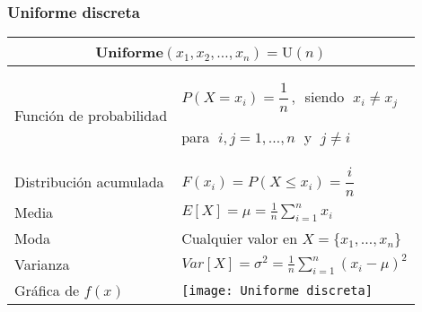 \documentclass[12pt,a4paper]{article}
\begin{document}
\subsubsection*{Uniforme discreta}
\begin{center}
	\begin{tabular}{p{}|p{}}
	\multicolumn{2}{c}{Uniforme$(x_1,x_2,\ldots,x_n) = \text{U}(n)$} \\
	\hline
	Función de probabilidad & $P(X = x_i) = \dfrac{1}{n}\, ,\,$ siendo $\; x_i\neq x_j$\par para $\; i,j = 1,\ldots,n\;$ y $\; j\neq i$ \\
	Distribución acumulada & $F(x_i) = P(X\leq x_i) = \dfrac{i}{n}$ \\
	Media & $E[X] = \mu = \displaystyle{\frac{1}{n}\sum_{i = 1}^n x_i}$ \\
	Moda & Cualquier valor en $X = \{x_1,\ldots,x_n\}$ \\
	Varianza & $Var[X] = \sigma^2 = \displaystyle{\frac{1}{n}\sum_{i = 1}^n (x_i - \mu)^2}$ \\
	\vspace{0.25cm}Gráfica de $f(x)$ & \vspace{0.1mm}\texttt{[image: Uniforme discreta]}
	\end{tabular}
\end{center}
\end{document}

